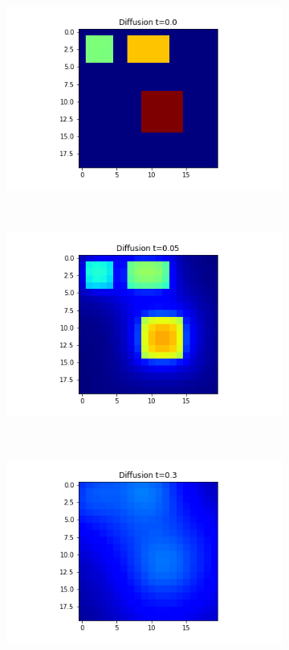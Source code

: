 \documentclass[10pt,a4paper]{article}
\theoremstyle{plain}
\theoremstyle{definition}
\begin{document}
\begin{figure}[!h]
\begin{subfigure}[b]{0.25\textwidth}
    		\caption{}
    		\label{laplacet5}
    	\end{subfigure} \\
    	\begin{subfigure}[b]{0.25\textwidth}
    		\includegraphics[width=\textwidth]{images/mellin-x3-t0.png}
    		\caption{}
    		\label{mellint0}
    	\end{subfigure}~
    	\begin{subfigure}[b]{0.25\textwidth}
    		\includegraphics[width= \textwidth]{images/mellin-x3-t05.png}
    		\caption{}
    		\label{mellint05}
    	\end{subfigure}~
    	\begin{subfigure}[b]{0.25\textwidth}
    		\includegraphics[width= \textwidth]{images/mellin-x3-t3.png}

\end{subfigure}
\end{figure}
\end{document}
